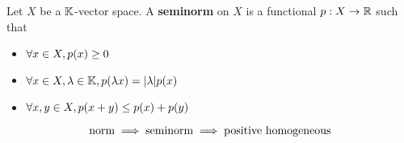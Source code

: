 \documentclass{article}
\begin{document}
\begin{dfn*}
  Let $X$ be a $\mathbb K$-vector space. A {\bf seminorm} on $X$ is a functional $p : X \to \mathbb R$ such that
  \begin{itemize}
    \item $\forall x \in X, p(x) \ge 0$
    \item $\forall x \in X, \lambda \in \mathbb K, p(\lambda x) = |\lambda| p(x)$
    \item $\forall x, y \in X, p(x + y) \le p(x) + p(y)$
  \end{itemize}
\end{dfn*}

\begin{rmk}
  $$\text{norm} \implies \text{seminorm} \implies \text{positive homogeneous}$$
\end{rmk}

\newlec
\end{document}
